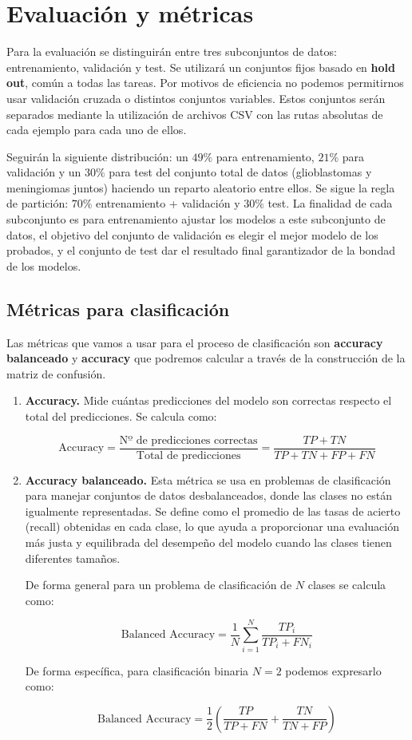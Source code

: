 \section{Evaluación y métricas}

Para la evaluación se distinguirán entre tres subconjuntos de datos: entrenamiento, validación y test. Se utilizará un conjuntos fijos basado en \textbf{hold out}, común a todas las tareas. Por motivos de eficiencia no podemos permitirnos usar validación cruzada o distintos conjuntos variables. Estos conjuntos serán separados mediante la utilización de archivos CSV con las rutas absolutas de cada ejemplo para cada uno de ellos. 

Seguirán la siguiente distribución: un $49 \%$ para entrenamiento, $21 \%$ para validación y un $30 \%$ para test del conjunto total de datos (glioblastomas y meningiomas juntos) haciendo un reparto aleatorio entre ellos. Se sigue la regla de partición: $70 \%$ entrenamiento + validación y $30 \%$ test. La finalidad de cada subconjunto es para entrenamiento ajustar los modelos a este subconjunto de datos, el objetivo del conjunto de validación es elegir el mejor modelo de los probados, y el conjunto de test dar el resultado final garantizador de la bondad de los modelos.

\subsection{Métricas para clasificación}

Las métricas que vamos a usar para el proceso de clasificación son \textbf{accuracy balanceado} y \textbf{accuracy} que podremos calcular a través de la construcción de la matriz de confusión. 

\begin{enumerate}
	\item \textbf{Accuracy.} Mide cuántas predicciones del modelo son correctas respecto el total del predicciones. Se calcula como: 
	
	$$ \text{Accuracy} = \frac{\text{Nº de predicciones correctas}}{\text{Total de predicciones}} = \frac{TP + TN}{TP + TN + FP + FN}$$
	
	\item \textbf{Accuracy balanceado.} Esta métrica se usa en problemas de clasificación para manejar conjuntos de datos desbalanceados, donde las clases no están igualmente representadas. Se define como el promedio de las tasas de acierto (recall) obtenidas en cada clase, lo que ayuda a proporcionar una evaluación más justa y equilibrada del desempeño del modelo cuando las clases tienen diferentes tamaños.
	
	De forma general para un problema de clasificación de $N$ clases se calcula como:
	
	$$  \text{Balanced Accuracy} = \frac{1}{N} \sum_{i=1}^{N} \frac{TP_i}{TP_i + FN_i}$$
	
	De forma específica, para clasificación binaria $N = 2$ podemos expresarlo como:
	
	$$ \text{Balanced Accuracy} = \frac{1}{2} \left( \frac{TP}{TP + FN} + \frac{TN}{TN + FP} \right) $$ 
\end{enumerate}


